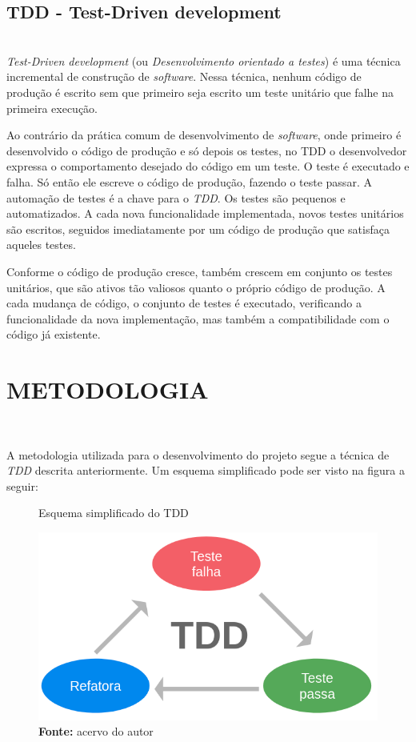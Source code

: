\documentclass[times, twoside, watermark]{artigo}
\begin{document}
\subsection{TDD - Test-Driven development}\hfill\\

\textit{Test-Driven development} (ou \textit{Desenvolvimento orientado a testes}) é uma técnica
incremental de construção de \textit{software}. 
Nessa técnica, nenhum código de produção é escrito sem que primeiro seja escrito um 
teste unitário que falhe na primeira execução. 

Ao contrário da prática comum de desenvolvimento de \textit{software}, onde primeiro é desenvolvido o
código de produção e só depois os testes, no TDD
o desenvolvedor expressa o comportamento desejado do código em um teste. 
O teste é executado e falha. Só então ele escreve o código de produção, fazendo o teste passar.
A automação de testes é a chave para o \textit{TDD}. Os testes são pequenos e automatizados.
A cada nova funcionalidade implementada, novos testes unitários são escritos, 
seguidos imediatamente por um código de produção que satisfaça aqueles testes. 

Conforme o código de produção cresce, também crescem em conjunto os testes unitários, 
que são ativos tão valiosos quanto o próprio código de produção. 
A cada mudança de código, o conjunto de testes é executado, verificando a funcionalidade da nova
implementação, mas também a compatibilidade com o código já existente\cite{tddembeddedc}.

\section{METODOLOGIA}\hfill\

A metodologia utilizada para o desenvolvimento do projeto segue a técnica de \textit{TDD} descrita anteriormente. 
Um esquema simplificado pode ser visto na figura a seguir:\hfill\

\begin{figure}[H]
    \centering
    \caption{Esquema simplificado do TDD}
    \includegraphics[width=0.95\linewidth]{images/tdd.png}
    \caption*{\newline\textbf{Fonte:} acervo do autor}
\end{figure}
\end{document}
